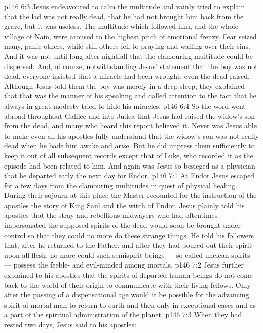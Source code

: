 \vs p146 6:3 Jesus endeavoured to calm the multitude and vainly tried to explain that the lad was not really dead, that he had not brought him back from the grave, but it was useless. The multitude which followed him, and the whole village of Nain, were aroused to the highest pitch of emotional frenzy. Fear seized many, panic others, while still others fell to praying and wailing over their sins. And it was not until long after nightfall that the clamouring multitude could be dispersed. And, of course, notwithstanding Jesus’ statement that the boy was not dead, everyone insisted that a miracle had been wrought, even the dead raised. Although Jesus told them the boy was merely in a deep sleep, they explained that that was the manner of his speaking and called attention to the fact that he always in great modesty tried to hide his miracles.
\vs p146 6:4 So the word went abroad throughout Galilee and into Judea that Jesus had raised the widow’s son from the dead, and many who heard this report believed it. Never was Jesus able to make even all his apostles fully understand that the widow’s son was not really dead when he bade him awake and arise. But he did impress them sufficiently to keep it out of all subsequent records except that of Luke, who recorded it as the episode had been related to him. And again was Jesus so besieged as a physician that he departed early the next day for Endor.
\vs p146 7:1 At Endor Jesus escaped for a few days from the clamouring multitudes in quest of physical healing. During their sojourn at this place the Master recounted for the instruction of the apostles the story of King Saul and the witch of Endor. Jesus plainly told his apostles that the stray and rebellious midwayers who had oftentimes impersonated the supposed spirits of the dead would soon be brought under control so that they could no more do these strange things. He told his followers that, after he returned to the Father, and after they had poured out their spirit upon all flesh, no more could such semispirit beings --- so\hyp{}called unclean spirits --- possess the feeble\hyp{} and evil\hyp{}minded among mortals.
\vs p146 7:2 Jesus further explained to his apostles that the spirits of departed human beings do not come back to the world of their origin to communicate with their living fellows. Only after the passing of a dispensational age would it be possible for the advancing spirit of mortal man to return to earth and then only in exceptional cases and as a part of the spiritual administration of the planet.
\vs p146 7:3 When they had rested two days, Jesus said to his apostles: 
\quizlink
